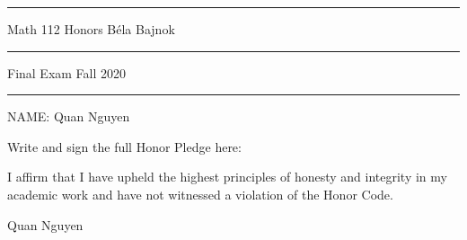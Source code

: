 \documentclass[12pt]{article}
\begin{document}
\hrule
\vspace{.2cm}

{\Large \noindent Math 112 Honors
\hfill
B\'ela Bajnok}

\vspace{.3cm}
\hrule

{\Large \noindent 
Final Exam
\hfill
Fall 2020}

\vspace{.3cm}
\hrule

\noindent NAME:  Quan Nguyen

\noindent \hrulefill\rule{0pt}{4pt}

\noindent Write and sign the full Honor Pledge here:

\vspace{2mm}

I affirm that I have upheld the highest principles of honesty and integrity in my academic work and have not witnessed a violation of the Honor Code. \par

Quan Nguyen

\vspace{8mm}

\noindent \hrulefill\rule{0pt}{4pt}

\end{document}
